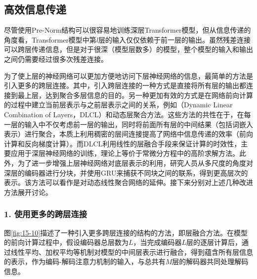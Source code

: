 
\subsection{高效信息传递}

\parinterval 尽管使用Pre-Norm结构可以很容易地训练深层Transformer模型，但从信息传递的角度看，Transformer模型中第$l$层的输入仅仅依赖于前一层的输出。虽然残差连接可以跨层传递信息，但是对于很深（模型层数多）的模型，整个模型的输入和输出之间仍需要经过很多次残差连接。

\parinterval 为了使上层的神经网络可以更加方便地访问下层神经网络的信息，最简单的方法是引入更多的跨层连接。其中，引入跨层连接的一种方式是直接将所有层的输出都连接到最上层，达到聚合多层信息的目的。另一种更加有效的方式是在网络前向计算的过程中建立当前层表示与之前层表示之间的关系，例如{\small{}}（Dynamic Linear Combination of Layers，DLCL）和动态层聚合方法。这些方法的共性在于，在每一层的输入中不仅考虑前一层的输出，同时将前面所有层的中间结果（包括词嵌入表示）进行聚合，本质上利用稠密的层间连接提高了网络中信息传递的效率（前向计算和反向梯度计算）。而DLCL利用线性的层融合手段来保证计算的时效性，主要应用于深层神经网络的训练，理论上等价于常微分方程中的高阶求解方法。此外，为了进一步增强上层神经网络对底层表示的利用，研究人员从多尺度的角度对深层的编码器进行分块，并使用GRU来捕获不同块之间的联系，得到更高层次的表示。该方法可以看作是对动态线性聚合网络的延伸。接下来分别对上述几种改进方法展开讨论。


\subsubsection{1. 使用更多的跨层连接}

\parinterval 图\ref{fig:15-10}描述了一种引入更多跨层连接的结构的方法，即层融合方法。在模型的前向计算过程中，假设编码器总层数为$L$，当完成编码器$L$层的逐层计算后，通过线性平均、加权平均等机制对模型的中间层表示进行融合，得到蕴含所有层信息的表示，作为编码-解码注意力机制的输入，与总共有$M$层的解码器共同处理解码信息。

